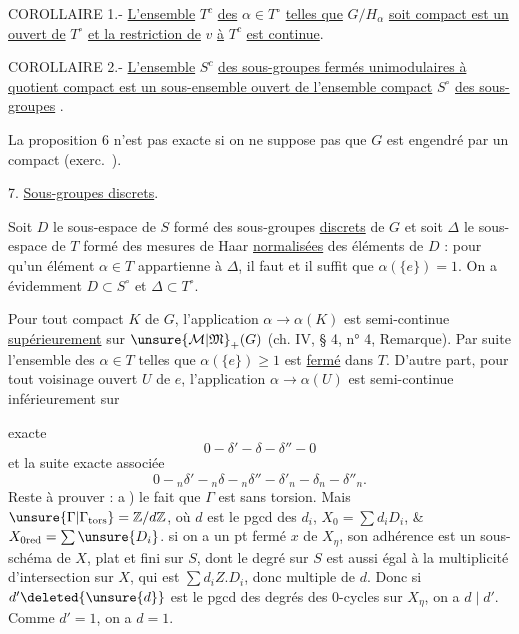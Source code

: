 COROLLAIRE 1.- \uline{L'ensemble} $T^c$ \uline{des} $\alpha\in T^\circ$ \uline{telles que} $G/H_\alpha$ \uline{soit compact est un ouvert de} $T^\circ$ \uline{et la restriction de} $v$ \uline{à} $T^c$ \uline{est continue}.

COROLLAIRE 2.- \uline{L'ensemble} $S^c$ \uline{des sous-groupes fermés unimodulaires à quotient compact est un sous-ensemble ouvert de l'ensemble compact} $S^\circ$ \uline{des sous-groupes} .

La proposition 6 n'est pas exacte si on ne suppose pas que $G$ est engendré par un compact (exerc.\ ).

7. \uline{Sous-groupes discrets}.

Soit $D$ le sous-espace de $S$ formé des sous-groupes \uline{discrets} de $G$ et soit $\Delta$ le sous-espace de $T$ formé des mesures de Haar \uline{normalisées} des éléments de $D$ : pour qu'un élément $\alpha\in T$ appartienne à $\Delta$, il faut et il suffit que $\alpha(\{e\})=1$. On a évidemment $D\subset S^\circ$ et $\Delta\subset T^\circ$.

Pour tout compact $K$ de $G$, l'application $\alpha\longrightarrow\alpha(K)$ est semi-continue \uline{supérieurement} sur $\unsure{\mathcal M|\mathfrak M}_+(G)$ (ch. IV, § 4, n° 4, Remarque). Par suite l'ensemble des $\alpha\in T$ telles que $\alpha(\{e\})\geq 1$ est \uline{fermé} dans $T$. D'autre part, pour tout voisinage ouvert $U$ de $e$, l'application $\alpha\longrightarrow\alpha(U)$ est semi-continue inférieurement sur

exacte
\[
0\mathbin{-}\delta'\mathbin{-}\delta\mathbin{-}\delta''\mathbin{-}0
\]
et la suite exacte associée
\[
0\mathbin{-}{}_n\delta'\mathbin{-}{}_n\delta\mathbin{-}{}_n\delta''\mathbin{-}\delta'_n\mathbin{-}\delta_n\mathbin{-}\delta''_n.
\]
Reste à prouver : \textcircled{a}) le fait que $\Gamma$ est sans torsion. Mais $\unsure{\Gamma|\Gamma_{\mathrm{tors}}}=\mathbb Z/d\mathbb Z$, où $d$ est le pgcd des $d_i$, $X_0=\sum d_iD_i$, \& $X_{0\mathrm{red}}=\sum\unsure{D_i}$.  si on a un pt fermé $x$ de $X_\eta$, son adhérence  est un sous-schéma   de $X$, plat et fini sur $S$,  dont le degré sur $S$ est aussi égal à la multiplicité d'intersection  sur $X$, qui est $\sum d_iZ.D_i$, donc multiple de $d$. Donc si $d'\deleted{\unsure{d}}$ est le pgcd des degrés des 0-cycles sur $X_\eta$, on a $d\mid d'$. Comme $d'=1$, on a $d=1$.

